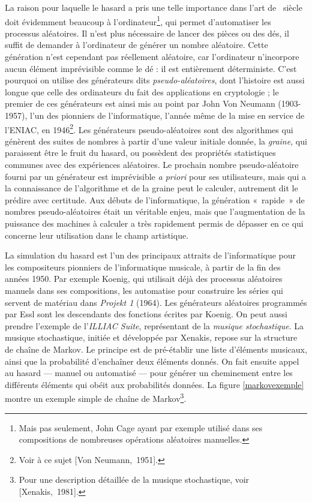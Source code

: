 \documentclass[a4paper,12pt]{article}
\newcommand{\guill}[1]{«~#1~»}
\newcommand{\cicite}[1]{{\footnotesize[#1]}}
\begin{document}
La raison pour laquelle le hasard a pris une telle importance dans l'art de \XXe~siècle doit évidemment beaucoup à l'ordinateur\footnote{Mais pas seulement, John Cage ayant par exemple utilisé dans ses compositions de nombreuses opérations aléatoires manuelles.}, qui permet d'automatiser les processus aléatoires. Il n'est plus nécessaire de lancer des pièces ou des dés, il suffit de demander à l'ordinateur de générer un nombre aléatoire. Cette génération n'est cependant pas réellement aléatoire, car l'ordinateur n'incorpore aucun élément imprévisible comme le dé : il est entièrement déterministe. C'est pourquoi on utilise des générateurs dits \emph{pseudo-aléatoires}, dont l'histoire est aussi longue que celle des ordinateurs du fait des applications en cryptologie ; le premier de ces générateurs est ainsi mis au point par John Von Neumann (1903-1957), l'un des pionniers de l'informatique, l'année même de la mise en service de l'ENIAC, en 1946\footnote{Voir à ce sujet \cicite{Von Neumann,~1951}.}. Les générateurs pseudo-aléatoires sont des algorithmes qui génèrent des suites de nombres à partir d'une valeur initiale donnée, la \emph{graine}, qui paraissent être le fruit du hasard, ou possèdent des propriétés statistiques communes avec des expériences aléatoires. Le prochain nombre pseudo-aléatoire fourni par un générateur est imprévisible \emph{a priori} pour ses utilisateurs, mais qui a la connaissance de l'algorithme et de la graine peut le calculer, autrement dit le prédire avec certitude. Aux débuts de l'informatique, la génération \guill{rapide} de nombres pseudo-aléatoires était un véritable enjeu, mais que l'augmentation de la puissance des machines à calculer a très rapidement permis de dépasser en ce qui concerne leur utilisation dans le champ artistique.

La simulation du hasard est l'un des principaux attraits de l'informatique pour les compositeurs pionniers de l'informatique musicale, à partir de la fin des années 1950. Par exemple Koenig, qui utilisait déjà des processus aléatoires manuels dans ses compositions, les automatise pour construire les séries qui servent de matériau dans \emph{Projekt 1} (1964). Les générateurs aléatoires programmés par Essl sont les descendants des fonctions écrites par Koenig. On peut aussi prendre l'exemple de l'\emph{ILLIAC Suite}, représentant de la \emph{musique stochastique}. La musique stochastique, initiée et développée par Xenakis, repose sur la structure de chaîne de Markov. Le principe est de pré-établir une liste d'éléments musicaux, ainsi que la probabilité d'enchaîner deux éléments donnés. On fait ensuite appel au hasard --- manuel ou automatisé --- pour générer un cheminement entre les différents éléments qui obéit aux probabilités données. La figure \ref{markovexemple} montre un exemple simple de chaîne de Markov\footnote{Pour une description détaillée de la musique stochastique, voir \cicite{Xenakis,~1981}.}.
\end{document}
